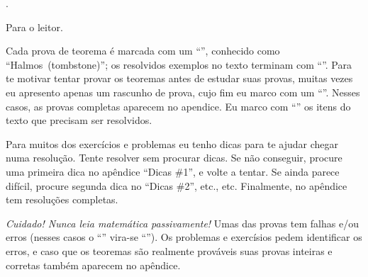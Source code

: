 \chapteroid \prefacename.

\sectionoid Para o leitor.

Cada prova de teorema é marcada com um ``\thinspace\qedsymbol\thinspace'',
conhecido como ``Halmos\Halmos[tombstone]~(tombstone)'';
os resolvidos exemplos no texto terminam com ``\thinspace\qexsymbol\thinspace''.
Para te motivar tentar provar os teoremas antes de estudar suas provas,
muitas vezes eu apresento apenas um rascunho de prova,
cujo fim eu marco com um ``\thinspace\qessymbol\thinspace''.
Nesses casos, as provas completas aparecem no apendice.
Eu marco com ``\thinspace\activitysymbol\thinspace'' os itens do texto que
precisam ser resolvidos.

Para muitos dos exercícios e problemas eu tenho dicas para te ajudar chegar
numa resolução.  Tente resolver sem procurar dicas.
Se não conseguir, procure uma primeira dica no apêndice ``Dicas \#1'',
e volte a tentar.
Se ainda parece difícil, procure segunda dica no ``Dicas \#2'',
etc., etc.
Finalmente, no apêndice tem resoluções completas.

\emph{Cuidado! Nunca leia matemática passivamente!}
Umas das provas tem falhas e/ou erros
(nesses casos o ``\thinspace\qedsymbol\thinspace''
vira-se ``\thinspace\mistakesymbol\thinspace'').
Os problemas e exercísios pedem identificar os erros,
e caso que os teoremas são realmente prováveis suas provas
inteiras e corretas também aparecem no apêndice.

\endsectionoid

\endchapteroid
